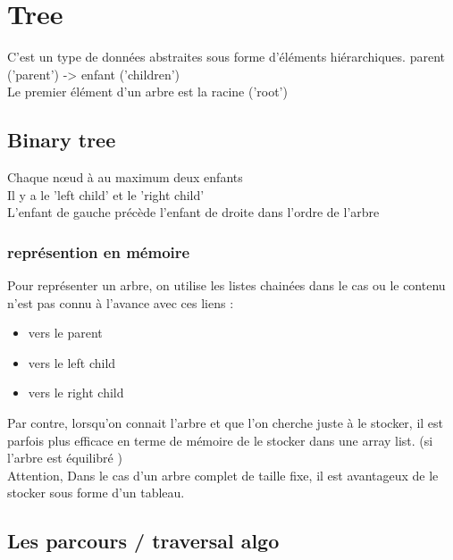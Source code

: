 \documentclass[a4paper]{article}
\begin{document}
\section{Tree}
C'est un type de données abstraites sous forme d'éléments hiérarchiques. parent ('parent') -> enfant ('children')\\
Le premier élément d'un arbre est la racine ('root')

\subsection{Binary tree}
Chaque nœud à au maximum deux enfants\\
Il y a le 'left child' et le 'right child'\\
L'enfant de gauche précède l'enfant de droite dans l'ordre de l'arbre
\subsubsection{représention en mémoire}
Pour représenter un arbre, on utilise les listes chainées dans le cas ou le contenu n'est pas connu à l'avance avec ces liens :
\begin{itemize}
\item vers le parent
\item vers le left child
\item vers le right child
\end{itemize}

Par contre, lorsqu'on connait l'arbre et que l'on cherche juste à le stocker, il est parfois plus efficace en terme de mémoire de le stocker dans une array list. (si l'arbre est équilibré )\\
Attention, Dans le cas d'un arbre complet de taille fixe, il est avantageux de le stocker sous forme d'un tableau.

\subsection{Les parcours / traversal algo}
\end{document}
